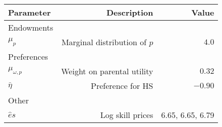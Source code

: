 \begin{tabular}{lrr}
\hline
Parameter & Description  & Value  \\ 
\hline
Endowments &   &   \\ 
$\mu_{p}$ & Marginal distribution of $p$  & $4.0$  \\ 
Preferences &   &   \\ 
$\mu_{\omega,p}$ & Weight on parental utility  & $0.32$  \\ 
$\bar{\eta}$ & Preference for HS  & $-0.90$  \\ 
Other &   &   \\ 
$\hat{e}{s}$ & Log skill prices  & 6.65, 6.65, 6.79  \\ 
\hline
\end{tabular}%
